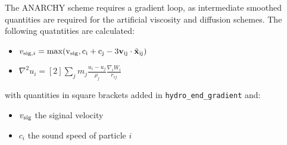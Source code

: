 The ANARCHY scheme requires a gradient loop, as intermediate smoothed quantities are required
for the artificial viscosity and diffusion schemes. The following quatntities are calculated:
\begin{itemize}
	\item $v_{{\rm sig}, i} = \rm{max}(v_{\rm sig}, c_i + c_j - 3\mathbf{v}_{ij} \cdot \tilde{\mathbf{x}}_{ij})$
	\item $\nabla^2 u_i = [2]\sum_j m_j \frac{u_i - u_j}{\rho_j} \frac{\nabla_i W_i}{r_{ij}}$
\end{itemize}
with quantities in square brackets added in {\tt hydro\_end\_gradient} and:
\begin{itemize}
	\item $v_{\rm sig}$ the siginal velocity	
	\item $c_i$ the sound speed of particle $i$
\end{itemize}

